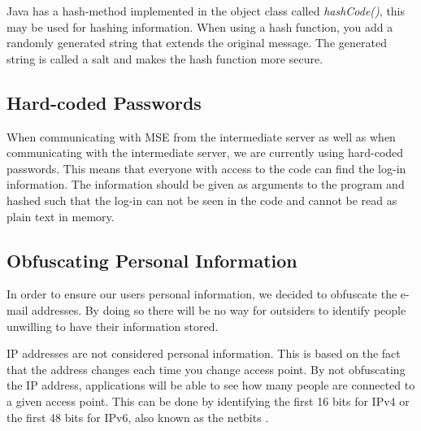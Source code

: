 Java has a hash-method implemented in the object class called \textit{hashCode()}, this may be used for hashing information. When using a hash function, you add a randomly generated string that extends the original message. The generated string is called a salt and makes the hash function more secure.

\subsection*{Hard-coded Passwords}
When communicating with MSE from the intermediate server as well as when communicating with the intermediate server, we are currently using hard-coded passwords. This means that everyone with access to the code can find the log-in information. The information should be given as arguments to the program and hashed such that the log-in can not be seen in the code and cannot be read as plain text in memory. 

 
\subsection*{Obfuscating Personal Information}
In order to ensure our users personal information, we decided to obfuscate the e-mail addresses. By doing so there will be no way for outsiders to identify people unwilling to have their information stored.

IP addresses are not considered personal information. This is based on the fact that the address changes each time you change access point. By not obfuscating the IP address, applications will be able to see how many people are connected to a given access point. This can be done by identifying the first 16 bits for IPv4 or the first 48 bits for IPv6, also known as the netbits \cite{IPnetworkID}.